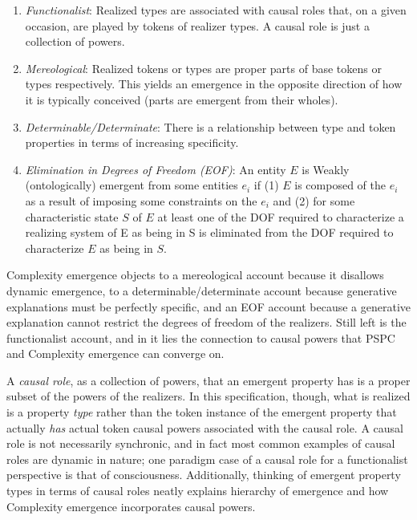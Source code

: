 \documentclass{article}
\newcommand{\ti}[1]{\textit{#1}}
\begin{document}
\begin{enumerate}
    \item \ti{Functionalist}: Realized types are associated with causal roles that, on a given occasion, are played by tokens of realizer types. A causal role is just a collection of powers.

    \item \ti{Mereological}: Realized tokens or types are proper parts of base tokens or types respectively. This yields an emergence in the opposite direction of how it is typically conceived (parts are emergent from their wholes).

    \item \ti{Determinable/Determinate}: There is a relationship between type and token properties in terms of increasing specificity.

    \item \ti{Elimination in Degrees of Freedom (EOF)}: An entity $E$ is Weakly (ontologically) emergent from some entities $e_i$ if (1) $E$ is composed of the $e_i$ as a result of imposing some constraints on the $e_i$ and (2) for some characteristic state $S$ of $E$ at least one of the DOF required to characterize a realizing system of E as being in S is eliminated from the DOF required to characterize $E$ as being in $S$.
\end{enumerate}

Complexity emergence objects to a mereological account because it disallows dynamic emergence, to a determinable/determinate account because generative explanations must be perfectly specific, and an EOF account because a generative explanation cannot restrict the degrees of freedom of the realizers. Still left is the functionalist account, and in it lies the connection to causal powers that PSPC and Complexity emergence can converge on.

A \ti{causal role}, as a collection of powers, that an emergent property has is a proper subset of the powers of the realizers. In this specification, though, what is realized is a property \ti{type} rather than the token instance of the emergent property that actually \ti{has} actual token causal powers associated with the causal role. A causal role is not necessarily synchronic, and in fact most common examples of causal roles are dynamic in nature; one paradigm case of a causal role for a functionalist perspective is that of consciousness. Additionally, thinking of emergent property types in terms of causal roles neatly explains hierarchy of emergence and how Complexity emergence incorporates causal powers.
\end{document}
